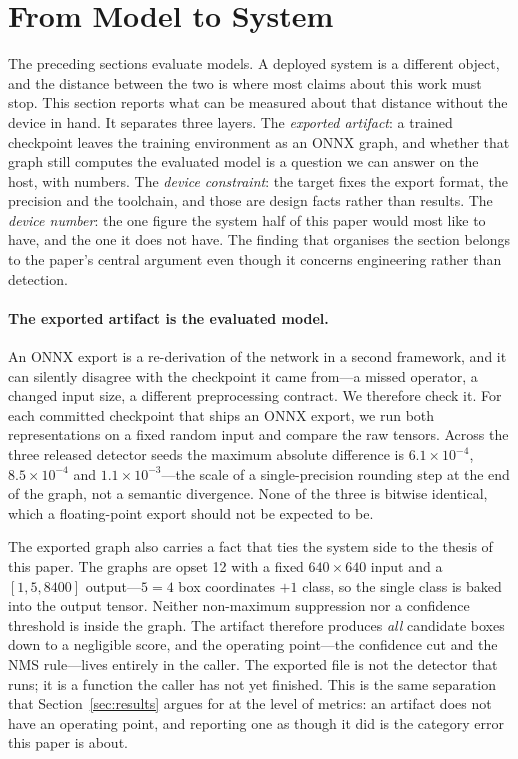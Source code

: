 \section{From Model to System}
\label{sec:system}

The preceding sections evaluate models. A deployed system is a different object,
and the distance between the two is where most claims about this work must stop.
This section reports what can be measured about that distance without the device
in hand. It separates three layers. The \emph{exported artifact}: a trained
checkpoint leaves the training environment as an ONNX graph, and whether that
graph still computes the evaluated model is a question we can answer on the host,
with numbers. The \emph{device constraint}: the target fixes the export format,
the precision and the toolchain, and those are design facts rather than results.
The \emph{device number}: the one figure the system half of this paper would most
like to have, and the one it does not have. The finding that organises the section
belongs to the paper's central argument even though it concerns engineering rather
than detection.

\paragraph{The exported artifact is the evaluated model.} An ONNX export is a
re-derivation of the network in a second framework, and it can silently disagree
with the checkpoint it came from---a missed operator, a changed input size, a
different preprocessing contract. We therefore check it. For each committed
checkpoint that ships an ONNX export, we run both representations on a fixed
random input and compare the raw tensors. Across the three released detector seeds
the maximum absolute difference is $6.1\times10^{-4}$, $8.5\times10^{-4}$ and
$1.1\times10^{-3}$---the scale of a single-precision rounding step at the end of
the graph, not a semantic divergence. None of the three is bitwise identical,
which a floating-point export should not be expected to be.

The exported graph also carries a fact that ties the system side to the thesis of
this paper. The graphs are opset 12 with a fixed $640\times640$ input and a
$[1, 5, 8400]$ output---$5 = 4$ box coordinates $+ 1$ class, so the single class
is baked into the output tensor. Neither non-maximum suppression nor a confidence
threshold is inside the graph. The artifact therefore produces \emph{all}
candidate boxes down to a negligible score, and the operating point---the
confidence cut and the NMS rule---lives entirely in the caller. The exported file
is not the detector that runs; it is a function the caller has not yet finished.
This is the same separation that Section~\ref{sec:results} argues for at the level
of metrics: an artifact does not have an operating point, and reporting one as
though it did is the category error this paper is about.

